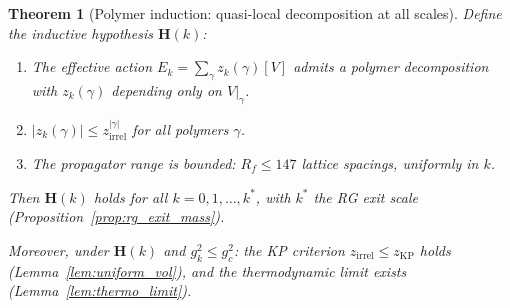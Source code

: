 \documentclass[11pt,a4paper]{amsart}
\newtheorem{theorem}{Theorem}[section]
\theoremstyle{definition}
\newcommand{\gB}{g^2_c}
\begin{document}
\begin{theorem}[Polymer induction: quasi-local decomposition at all scales]
\label{thm:polymer_induction}
Define the inductive hypothesis $\mathbf{H}(k)$:
\begin{enumerate}[label=\textup{(IH\arabic*)}]
\item The effective action $E_k = \sum_\gamma z_k(\gamma)[V]$ admits a polymer
      decomposition with $z_k(\gamma)$ depending only on $V\big|_\gamma$.
\item $|z_k(\gamma)| \le z_{\mathrm{irrel}}^{|\gamma|}$ for all polymers $\gamma$.
\item The propagator range is bounded: $R_f \le 147$ lattice spacings, uniformly in $k$.
\end{enumerate}
Then $\mathbf{H}(k)$ holds for all $k = 0, 1, \ldots, k^*$, with $k^*$ the RG exit
scale (Proposition~\ref{prop:rg_exit_mass}).

Moreover, under $\mathbf{H}(k)$ and $g^2_k \le \gB$:
the KP criterion $z_{\mathrm{irrel}} \le z_{\mathrm{KP}}$ holds
\textup{(}Lemma~\ref{lem:uniform_vol}\textup{)}, and the thermodynamic limit exists
\textup{(}Lemma~\ref{lem:thermo_limit}\textup{)}.
\end{theorem}
\end{document}
